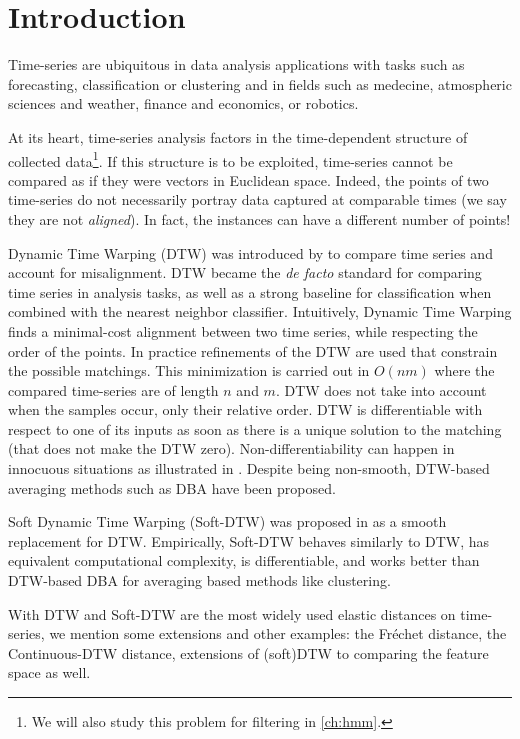 \section{Introduction}

Time-series are ubiquitous in data analysis applications with tasks such as forecasting, classification or clustering and in fields such as medecine, atmospheric sciences and weather, finance and economics, or robotics.

At its heart, time-series analysis factors in the time-dependent structure of collected data\footnote{We will also study this problem for filtering in \cref{ch:hmm}.}. If this structure is to be exploited, time-series cannot be compared as if they were vectors in Euclidean space. Indeed, the points of two time-series do not necessarily portray data captured at comparable times (we say they are not \emph{aligned}). In fact, the instances can have a different number of points!

Dynamic Time Warping (DTW) was introduced by \cite{dtw-sakoe} to compare time series and account for misalignment. DTW became the \emph{de facto} standard for comparing time series in analysis tasks, as well as a strong baseline for classification when combined with the nearest neighbor classifier\cite{dtw-baseline-1, dtw-baseline-2}. Intuitively, Dynamic Time Warping finds a minimal-cost alignment between two time series, while respecting the order of the points. In practice refinements of the DTW are used that constrain the possible matchings\cite{dtw-baseline-1}. This minimization is carried out in $O(nm)$ where the compared time-series are of length $n$ and $m$. DTW does not take into account when the samples occur, only their relative order. DTW is differentiable with respect to one of its inputs as soon as there is a unique solution to the matching (that does not make the DTW zero). Non-differentiability can happen in innocuous situations as illustrated in \cite{tavenard-dtw-diff}. Despite being non-smooth, DTW-based averaging methods such as DBA have been proposed\cite{dba-petitjean}.

Soft Dynamic Time Warping (Soft-DTW) was proposed in \cite{sdtw} as a smooth replacement for DTW. Empirically, Soft-DTW behaves similarly to DTW, has equivalent computational complexity, is differentiable, and works better than DTW-based DBA for averaging based methods like clustering.

With DTW and Soft-DTW are the most widely used elastic distances on time-series, we mention some extensions and other examples: the Fréchet distance\cite{frechet-clustering}, the Continuous-DTW distance\cite{cdtw}, extensions of (soft)DTW to comparing the feature space as well\cite{dtw-incomparable,vayer2022time}.


